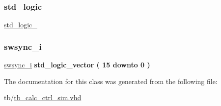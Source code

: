 \subsubsection{\texorpdfstring{std\+\_\+logic\+\_}{std\_logic\_1164}}
{\footnotesize\ttfamily \hyperlink{classtb__calc__ctrl_1_1sim_acd03516902501cd1c7296a98e22c6fcb}{std\+\_\+logic\+\_}\hspace{0.3cm}{\ttfamily [Package]}}

\mbox{\label{classtb__calc__ctrl_1_1sim_a0e9b3de9ba7928cacb930384f44e32e2}} 
\subsubsection{\texorpdfstring{swsync\+\_\+i}{swsync\_i}}
{\footnotesize\ttfamily \hyperlink{classtb__calc__ctrl_1_1sim_a0e9b3de9ba7928cacb930384f44e32e2}{swsync\+\_\+i} {\bfseries \textcolor{comment}{std\+\_\+logic\+\_\+vector}\textcolor{vhdlchar}{ }\textcolor{vhdlchar}{(}\textcolor{vhdlchar}{ }\textcolor{vhdlchar}{ } \textcolor{vhdldigit}{15} \textcolor{vhdlchar}{ }\textcolor{keywordflow}{downto}\textcolor{vhdlchar}{ }\textcolor{vhdlchar}{ } \textcolor{vhdldigit}{0} \textcolor{vhdlchar}{ }\textcolor{vhdlchar}{)}\textcolor{vhdlchar}{ }} \hspace{0.3cm}{\ttfamily [Signal]}}



The documentation for this class was generated from the following file\+:\begin{DoxyCompactItemize}
\item 
tb/\hyperlink{tb__calc__ctrl__sim_8vhd}{tb\+\_\+calc\+\_\+ctrl\+\_\+sim.\+vhd}\end{DoxyCompactItemize}
